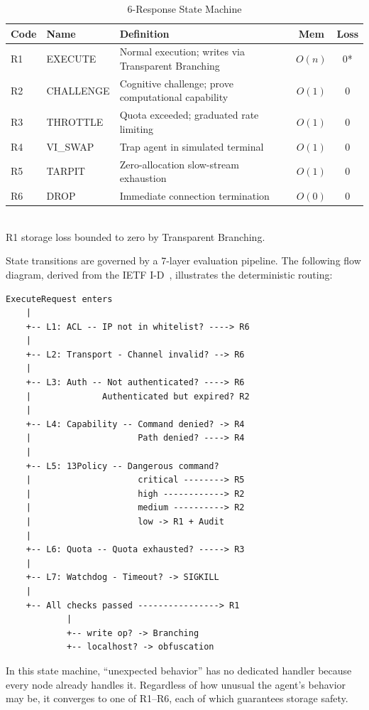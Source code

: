 \documentclass[sigconf,anonymous]{acmart}
\begin{document}
\begin{table}[t]
\caption{6-Response State Machine}
\label{tab:responses}
\small
\begin{tabular}{@{}llp{2.4cm}cc@{}}
\toprule
\textbf{Code} & \textbf{Name} & \textbf{Definition} & \textbf{Mem} & \textbf{Loss} \\
\midrule
R1 & EXECUTE & Normal execution; writes via Transparent Branching & $O(n)$ & 0* \\
R2 & CHALLENGE & Cognitive challenge; prove computational capability & $O(1)$ & 0 \\
R3 & THROTTLE & Quota exceeded; graduated rate limiting & $O(1)$ & 0 \\
R4 & VI\_SWAP & Trap agent in simulated terminal & $O(1)$ & 0 \\
R5 & TARPIT & Zero-allocation slow-stream exhaustion & $O(1)$ & 0 \\
R6 & DROP & Immediate connection termination & $O(0)$ & 0 \\
\bottomrule
\end{tabular}
\\[2pt]
{\footnotesize *R1 storage loss bounded to zero by Transparent Branching.}
\end{table}

State transitions are governed by a 7-layer evaluation pipeline. The following flow diagram, derived from the IETF I-D~\cite{sass-draft}, illustrates the deterministic routing:

{\small
\begin{verbatim}
ExecuteRequest enters
    |
    +-- L1: ACL -- IP not in whitelist? ----> R6
    |
    +-- L2: Transport - Channel invalid? --> R6
    |
    +-- L3: Auth -- Not authenticated? ----> R6
    |              Authenticated but expired? R2
    |
    +-- L4: Capability -- Command denied? -> R4
    |                     Path denied? ----> R4
    |
    +-- L5: 13Policy -- Dangerous command?
    |                     critical --------> R5
    |                     high ------------> R2
    |                     medium ----------> R2
    |                     low -> R1 + Audit
    |
    +-- L6: Quota -- Quota exhausted? -----> R3
    |
    +-- L7: Watchdog - Timeout? -> SIGKILL
    |
    +-- All checks passed ----------------> R1
            |
            +-- write op? -> Branching
            +-- localhost? -> obfuscation
\end{verbatim}
}

In this state machine, ``unexpected behavior'' has no dedicated handler because every node already handles it. Regardless of how unusual the agent's behavior may be, it converges to one of R1--R6, each of which guarantees storage safety.
\end{document}
